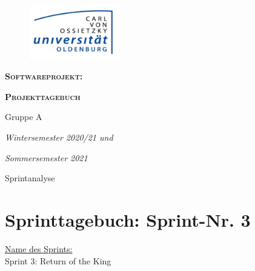 \documentclass[12pt,a4paper, oneside]{article}
\author{Uni Oldenburg, SWP2020 Gruppe A}
\begin{document}
    \begin{titlepage}
        \pagestyle{empty}
        \begin{center}

            \begin{figure}[h]
                \centering
                \includegraphics[width=0.35\textwidth]{../img/Logo.jpg}
            \end{figure}

            \bigskip \bigskip \noindent
            \textsc{\textbf{\LARGE Softwareprojekt:}} \par \bigskip \noindent
            \textsc{\textbf{\LARGE Projekttagebuch}}


            \par \bigskip \bigskip \bigskip \bigskip \bigskip \noindent
            {\Large Gruppe A} \par \medskip \noindent

            \par \bigskip \bigskip \bigskip \bigskip \bigskip \bigskip \noindent
            \textit{\Large Wintersemester 2020/21 und} \par \noindent
            \textit{\Large Sommersemester 2021}

            \par \bigskip \bigskip \bigskip \bigskip \bigskip \bigskip \noindent
            \par \bigskip \bigskip \bigskip \noindent
            {\Large Sprintanalyse} \par \medskip \noindent

        \end{center}
    \end{titlepage}

    \tableofcontents
    \pagebreak



    \section{Sprinttagebuch: Sprint-Nr. 3}
    \underline{Name des Sprints:}
    \\
    Sprint 3: Return of the King
\end{document}
